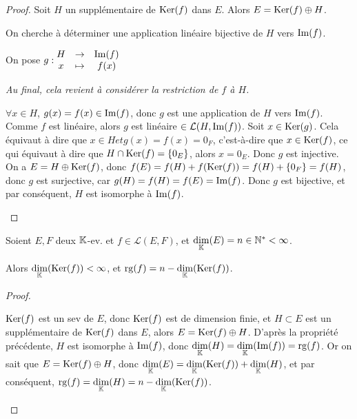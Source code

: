 \documentclass[12pt,a4paper]{report}
\begin{document}
\begin{proof}
    Soit $H$ un supplémentaire de $\mathrm{Ker}(f)$ dans $E$. Alors $E = \mathrm{Ker}(f) \oplus H$.

    On cherche à déterminer une application linéaire bijective de $H$ vers $\mathrm{Im}(f)$.

    On pose $g : \begin{matrix}
    H &\to &\mathrm{Im}(f)\\
    x &\mapsto &f(x)
    \end{matrix}$

    \textit{Au final, cela revient à considérer la restriction de $f$ à $H$.}

    \begin{outline}
        \1 $\forall x \in H$, $g(x) = f(x) \in \mathrm{Im}(f)$, donc $g$ est une application de $H$ vers $\mathrm{Im}(f)$.
        \1 Comme $f$ est linéaire, alors $g$ est linéaire $\in \mathcal L(H, \mathrm{Im}(f))$.
        \1 Soit $x \in \mathrm{Ker}(g)$. Cela équivaut à dire que $x\in H et g(x) = f(x) = 0_F$, c'est-à-dire que $x \in \mathrm{Ker}(f)$, ce qui équivaut à dire que $H \cap \mathrm{Ker}(f) = \{0_E\}$, alors $x = 0_E$. Donc $g$ est injective.
        \1 On a $E = H \oplus \mathrm{Ker}(f)$, donc $f(E) = f(H) + f(\mathrm{Ker}(f)) = f(H) + \{0_F\} = f(H)$, donc $g$ est surjective, car $g(H) = f(H) = f(E) = \mathrm{Im}(f)$.
        \1 Donc $g$ est bijective, et par conséquent, $H$ est isomorphe à $\mathrm{Im}(f)$.
    \end{outline}
\end{proof}

\begin{theorem}
    Soient $E,F$ deux $\mathbb{K}$-ev. et $f \in \mathcal L(E,F)$, et $\underset{\mathbb{K}}\dim(E) = n \in \mathbb{N}^* < \infty$.
    
    Alors $\underset{\mathbb{K}}\dim(\mathrm{Ker}(f)) < \infty$, et $\mathrm{rg}(f) = n - \underset{\mathbb{K}}\dim(\mathrm{Ker}(f))$.
\end{theorem}

\begin{proof}
    \begin{outline}
        \1 $\mathrm{Ker}(f)$ est un sev de $E$, donc $\mathrm{Ker}(f)$ est de dimension finie, et $H \subset E$ est un supplémentaire de $\mathrm{Ker}(f)$ dans $E$, alors $E = \mathrm{Ker}(f) \oplus H$.
        \1 D'après la propriété précédente, $H$ est isomorphe à $\mathrm{Im}(f)$, donc $\underset{\mathbb{K}}\dim(H) = \underset{\mathbb{K}}\dim(\mathrm{Im}(f)) = \mathrm{rg}(f)$.
        \1 Or on sait que $E = \mathrm{Ker}(f) \oplus H$, donc $\underset{\mathbb{K}}\dim(E) = \underset{\mathbb{K}}\dim(\mathrm{Ker}(f)) + \underset{\mathbb{K}}\dim(H)$, et par conséquent, $\mathrm{rg}(f) = \underset{\mathbb{K}}\dim(H) = n - \underset{\mathbb{K}}\dim(\mathrm{Ker}(f))$.
    \end{outline}
\end{proof}
\end{document}
